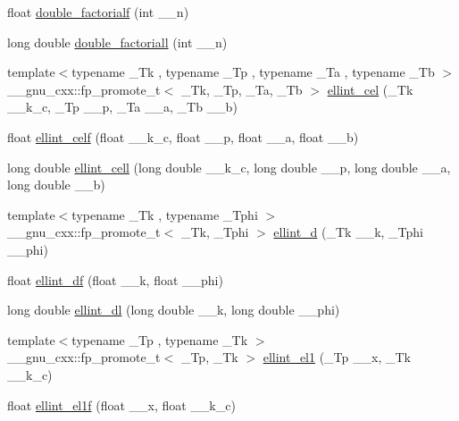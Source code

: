 \begin{DoxyCompactItemize}
float \hyperlink{group__mathsf__gnu_ga85ec284e603f32d18970bbdbb12d5150}{double\+\_\+factorialf} (int \+\_\+\+\_\+n)
\item 
long double \hyperlink{group__mathsf__gnu_ga0366730a4a775256217ef1cd9d0c3a04}{double\+\_\+factoriall} (int \+\_\+\+\_\+n)
\item 
{\footnotesize template$<$typename \+\_\+\+Tk , typename \+\_\+\+Tp , typename \+\_\+\+Ta , typename \+\_\+\+Tb $>$ }\\\+\_\+\+\_\+gnu\+\_\+cxx\+::fp\+\_\+promote\+\_\+t$<$ \+\_\+\+Tk, \+\_\+\+Tp, \+\_\+\+Ta, \+\_\+\+Tb $>$ \hyperlink{group__mathsf__gnu_ga6e44a0d90500e56ef4b3aba6efd7e2b0}{ellint\+\_\+cel} (\+\_\+\+Tk \+\_\+\+\_\+k\+\_\+c, \+\_\+\+Tp \+\_\+\+\_\+p, \+\_\+\+Ta \+\_\+\+\_\+a, \+\_\+\+Tb \+\_\+\+\_\+b)
\item 
float \hyperlink{group__mathsf__gnu_ga6d8fbef7853cf37de11278b1ff7127e8}{ellint\+\_\+celf} (float \+\_\+\+\_\+k\+\_\+c, float \+\_\+\+\_\+p, float \+\_\+\+\_\+a, float \+\_\+\+\_\+b)
\item 
long double \hyperlink{group__mathsf__gnu_gaa5add699fb2b4b02e63f8725a3a79750}{ellint\+\_\+cell} (long double \+\_\+\+\_\+k\+\_\+c, long double \+\_\+\+\_\+p, long double \+\_\+\+\_\+a, long double \+\_\+\+\_\+b)
\item 
{\footnotesize template$<$typename \+\_\+\+Tk , typename \+\_\+\+Tphi $>$ }\\\+\_\+\+\_\+gnu\+\_\+cxx\+::fp\+\_\+promote\+\_\+t$<$ \+\_\+\+Tk, \+\_\+\+Tphi $>$ \hyperlink{group__mathsf__gnu_gad75103894786e6d7766bac4d8447b6cc}{ellint\+\_\+d} (\+\_\+\+Tk \+\_\+\+\_\+k, \+\_\+\+Tphi \+\_\+\+\_\+phi)
\item 
float \hyperlink{group__mathsf__gnu_ga02ed50be21fdd84ad6bed003f94a9e69}{ellint\+\_\+df} (float \+\_\+\+\_\+k, float \+\_\+\+\_\+phi)
\item 
long double \hyperlink{group__mathsf__gnu_gaa34bcb8e316f2e8b2b2bf48cd89abd98}{ellint\+\_\+dl} (long double \+\_\+\+\_\+k, long double \+\_\+\+\_\+phi)
\item 
{\footnotesize template$<$typename \+\_\+\+Tp , typename \+\_\+\+Tk $>$ }\\\+\_\+\+\_\+gnu\+\_\+cxx\+::fp\+\_\+promote\+\_\+t$<$ \+\_\+\+Tp, \+\_\+\+Tk $>$ \hyperlink{group__mathsf__gnu_ga510b1e51e7d3bc937ed1b4c2f57492e4}{ellint\+\_\+el1} (\+\_\+\+Tp \+\_\+\+\_\+x, \+\_\+\+Tk \+\_\+\+\_\+k\+\_\+c)
\item 
float \hyperlink{group__mathsf__gnu_ga8d8342bb4f42c7fe09b5589c54d4e713}{ellint\+\_\+el1f} (float \+\_\+\+\_\+x, float \+\_\+\+\_\+k\+\_\+c)

\end{DoxyCompactItemize}
